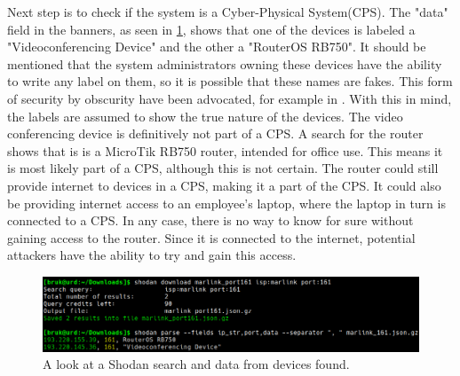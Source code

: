 Next step is to check if the system is a Cyber-Physical System(CPS). The "data" field in the banners, as seen in \cref{fig:marlink_traceroute_data}, shows that one of the devices is labeled a "Videoconferencing Device" and the other a "RouterOS RB750". It should be mentioned that the system administrators owning these devices have the ability to write any label on them, so it is possible that these names are fakes. This form of security by obscurity have been advocated, for example in \cite{bodenheim_butts_dunlap_mullins_2014}. With this in mind, the labels are assumed to show the true nature of the devices. 
The video conferencing device is definitively not part of a CPS. 
A search for the router shows that is is a MicroTik RB750 router, intended for office use.\cite{RB750} This means it is most likely part of a CPS, although this is not certain. The router could still provide internet to devices in a CPS, making it a part of the CPS. It could also be providing internet access to an employee's laptop, where the laptop in turn is connected to a CPS. In any case, there is no way to know for sure without gaining access to the router. Since it is connected to the internet, potential attackers have the ability to try and gain this access.

\begin{figure} [H]
    \centering
    \includegraphics[scale=0.4]{Figurer/marlink_161_data.png}
    \caption{A look at a Shodan search and data from devices found.}
    \label{fig:marlink_traceroute_data}
\end{figure}

\newpage
